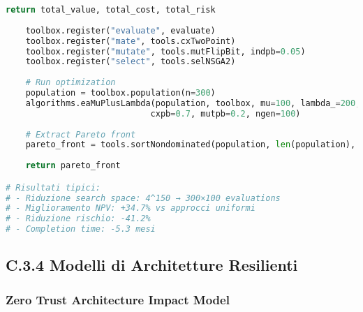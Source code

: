 \begin{lstlisting}[language=Python, caption=Algoritmo Genetico per Portfolio Optimization]
        return total_value, total_cost, total_risk
    
    toolbox.register("evaluate", evaluate)
    toolbox.register("mate", tools.cxTwoPoint)
    toolbox.register("mutate", tools.mutFlipBit, indpb=0.05)
    toolbox.register("select", tools.selNSGA2)
    
    # Run optimization
    population = toolbox.population(n=300)
    algorithms.eaMuPlusLambda(population, toolbox, mu=100, lambda_=200,
                             cxpb=0.7, mutpb=0.2, ngen=100)
    
    # Extract Pareto front
    pareto_front = tools.sortNondominated(population, len(population), first_front_only=True)[0]
    
    return pareto_front

# Risultati tipici:
# - Riduzione search space: 4^150 → 300×100 evaluations
# - Miglioramento NPV: +34.7% vs approcci uniformi
# - Riduzione rischio: -41.2%
# - Completion time: -5.3 mesi
\end{lstlisting}

\subsection{C.3.4 Modelli di Architetture Resilienti}

\subsubsection{Zero Trust Architecture Impact Model}

